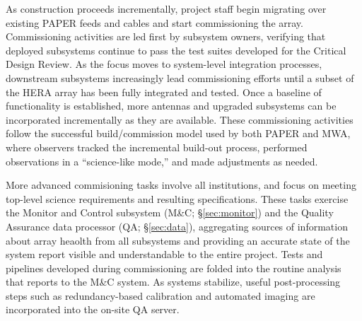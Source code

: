 \documentclass[preprint]{aastex}
\begin{document}
As construction proceeds incrementally, project staff begin migrating over existing PAPER feeds and cables 
and start commissioning the array.  
Commissioning activities are led first by subsystem owners, verifying that deployed subsystems 
continue to pass the test suites developed for the Critical Design Review.
As the focus moves to system-level integration processes, downstream subsystems increasingly
lead commissioning efforts until a subset of the HERA
array has been fully integrated and tested.  Once a baseline of functionality is established,
more antennas and upgraded subsystems can be incorporated incrementally as they are available.
These commissioning activities follow the successful
build/commission model used by both PAPER and MWA, %
where observers tracked the incremental build-out
process, performed observations in a ``science-like mode,'' and made
adjustments as needed. 

More advanced commisioning tasks involve all institutions, and
focus on meeting top-level science requirements
and resulting specifications.  %
These tasks exercise the Monitor and Control subsystem (M\&C; \S\ref{sec:monitor})
and the Quality Assurance data processor (QA; \S\ref{sec:data}), 
aggregating sources of
information about array heaolth from all subsystems and providing an accurate
state of the system report visible and understandable to the entire project.
Tests and pipelines developed during commissioning are folded into
the routine analysis that reports to the M\&C system.  As systems stabilize,
useful post-processing steps such as redundancy-based calibration and automated
imaging are incorporated into the on-site QA server.

\end{document}
